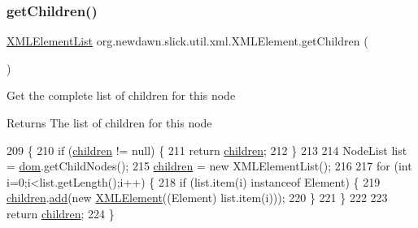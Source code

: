 \subsubsection{\texorpdfstring{get\+Children()}{getChildren()}}
{\footnotesize\ttfamily \mbox{\hyperlink{classorg_1_1newdawn_1_1slick_1_1util_1_1xml_1_1_x_m_l_element_list}{X\+M\+L\+Element\+List}} org.\+newdawn.\+slick.\+util.\+xml.\+X\+M\+L\+Element.\+get\+Children (\begin{DoxyParamCaption}{ }\end{DoxyParamCaption})\hspace{0.3cm}{\ttfamily [inline]}}

Get the complete list of children for this node

\begin{DoxyReturn}{Returns}
The list of children for this node 
\end{DoxyReturn}

\begin{DoxyCode}
209                                         \{
210         \textcolor{keywordflow}{if} (\mbox{\hyperlink{classorg_1_1newdawn_1_1slick_1_1util_1_1xml_1_1_x_m_l_element_a2d9787fb2a9c9cd8a01312d82ecdadce}{children}} != null) \{
211             \textcolor{keywordflow}{return} \mbox{\hyperlink{classorg_1_1newdawn_1_1slick_1_1util_1_1xml_1_1_x_m_l_element_a2d9787fb2a9c9cd8a01312d82ecdadce}{children}};
212         \}
213         
214         NodeList list = \mbox{\hyperlink{classorg_1_1newdawn_1_1slick_1_1util_1_1xml_1_1_x_m_l_element_a97e3ba0c57e0822e9111fd770807e64e}{dom}}.getChildNodes();
215         \mbox{\hyperlink{classorg_1_1newdawn_1_1slick_1_1util_1_1xml_1_1_x_m_l_element_a2d9787fb2a9c9cd8a01312d82ecdadce}{children}} = \textcolor{keyword}{new} XMLElementList();
216         
217         \textcolor{keywordflow}{for} (\textcolor{keywordtype}{int} i=0;i<list.getLength();i++) \{
218             \textcolor{keywordflow}{if} (list.item(i) instanceof Element) \{
219                 \mbox{\hyperlink{classorg_1_1newdawn_1_1slick_1_1util_1_1xml_1_1_x_m_l_element_a2d9787fb2a9c9cd8a01312d82ecdadce}{children}}.\mbox{\hyperlink{classorg_1_1newdawn_1_1slick_1_1util_1_1xml_1_1_x_m_l_element_list_a8c96e35bcd1302ab15810f88a0b6a212}{add}}(\textcolor{keyword}{new} \mbox{\hyperlink{classorg_1_1newdawn_1_1slick_1_1util_1_1xml_1_1_x_m_l_element_a5ccfa3d37df452a4f5680176e272f283}{XMLElement}}((Element) list.item(i)));
220             \}
221         \}
222         
223         \textcolor{keywordflow}{return} \mbox{\hyperlink{classorg_1_1newdawn_1_1slick_1_1util_1_1xml_1_1_x_m_l_element_a2d9787fb2a9c9cd8a01312d82ecdadce}{children}};
224     \}
\end{DoxyCode}
\mbox{\label{classorg_1_1newdawn_1_1slick_1_1util_1_1xml_1_1_x_m_l_element_ab88e2a14f1ad6b190199f76fdad17aa4}} 
